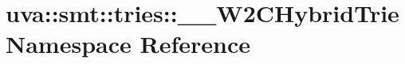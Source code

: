 \hypertarget{namespaceuva_1_1smt_1_1tries_1_1_____w2_c_hybrid_trie}{}\section{uva\+:\+:smt\+:\+:tries\+:\+:\+\_\+\+\_\+\+W2\+C\+Hybrid\+Trie Namespace Reference}
\label{namespaceuva_1_1smt_1_1tries_1_1_____w2_c_hybrid_trie}
